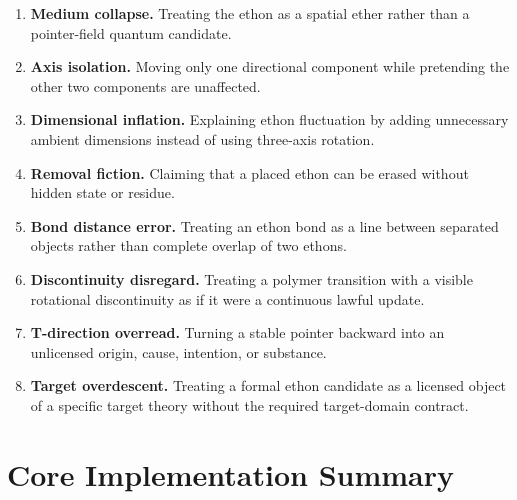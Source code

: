 \documentclass[11pt]{article}
\theoremstyle{definition}
\theoremstyle{plain}
\begin{document}
\begin{enumerate}[leftmargin=*]
  \item \textbf{Medium collapse.}  Treating the ethon as a spatial ether
  rather than a pointer-field quantum candidate.
  \item \textbf{Axis isolation.}  Moving only one directional component
  while pretending the other two components are unaffected.
  \item \textbf{Dimensional inflation.}  Explaining ethon fluctuation by
  adding unnecessary ambient dimensions instead of using three-axis
  rotation.
  \item \textbf{Removal fiction.}  Claiming that a placed ethon can be
  erased without hidden state or residue.
  \item \textbf{Bond distance error.}  Treating an ethon bond as a line
  between separated objects rather than complete overlap of two ethons.
  \item \textbf{Discontinuity disregard.}  Treating a polymer transition
  with a visible rotational discontinuity as if it were a continuous
  lawful update.
  \item \textbf{T-direction overread.}  Turning a stable pointer backward
  into an unlicensed origin, cause, intention, or substance.
  \item \textbf{Target overdescent.}  Treating a formal ethon candidate as
  a licensed object of a specific target theory without the required
  target-domain contract.
\end{enumerate}

\section{Core Implementation Summary}
\end{document}
